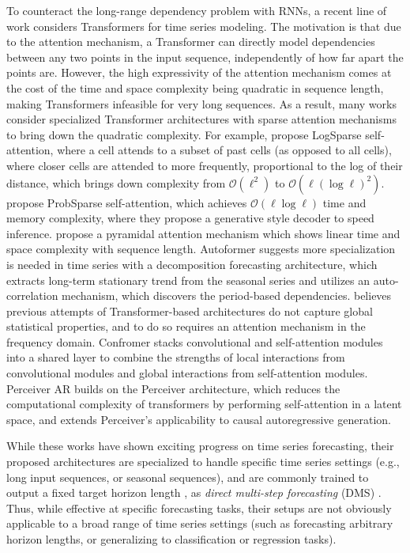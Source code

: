 To counteract the long-range dependency problem with RNNs, a recent line of work considers Transformers for time series modeling. The motivation is that due to the attention mechanism, a Transformer can directly model dependencies between any two points in the input sequence, independently of how far apart the points are. However, the high expressivity of the attention mechanism comes at the cost of the time and space complexity being quadratic in sequence length, making Transformers infeasible for very long sequences. As a result, many works consider specialized Transformer architectures with sparse attention mechanisms to bring down the quadratic complexity. For example, \cite{beltagy2020longformer} propose LogSparse self-attention, where a cell attends to a subset of past cells (as opposed to all cells), where closer cells are attended to more frequently, proportional to the log of their distance, which brings down complexity from $\mathcal{O}(\ell^2)$ to $\mathcal{O}(\ell(\log \ell)^2)$. \cite{zhou2021informer} propose ProbSparse self-attention, which achieves $\mathcal{O}(\ell \log \ell)$ time and memory complexity, where they propose a generative style decoder to speed inference. \cite{liu2022pyraformer} propose a pyramidal attention mechanism which shows linear time and space complexity with sequence length. Autoformer \citep{wu2021autoformer} suggests more specialization is needed in time series with a decomposition forecasting architecture, which extracts long-term stationary trend from the seasonal series and utilizes an auto-correlation mechanism, which discovers the period-based dependencies. \cite{zhou2022fedformer} believes previous attempts of Transformer-based architectures do not capture global statistical properties, and to do so requires an attention mechanism in the frequency domain. Confromer \citep{gulati2020conformer} stacks convolutional and self-attention modules into a shared layer to combine the strengths of local interactions from convolutional modules and global interactions from self-attention modules. Perceiver AR \citep{hawthorne2022general} builds on the Perceiver architecture, which reduces the computational complexity of transformers by performing self-attention in a latent space, and extends Perceiver's applicability to causal autoregressive generation.

While these works have shown exciting progress on time series forecasting, their proposed architectures are specialized to handle specific time series settings (e.g., long input sequences, or seasonal sequences), and are commonly trained to output a fixed target horizon length \citep{zhou2021informer}, \ie{} as \emph{direct multi-step forecasting} (DMS) \cite{https://doi.org/10.1111/j.1467-6419.2007.00518.x}. Thus, while effective at specific forecasting tasks, their setups are not obviously applicable to a broad range of time series settings (such as forecasting arbitrary horizon lengths, or generalizing to classification or regression tasks).
%

